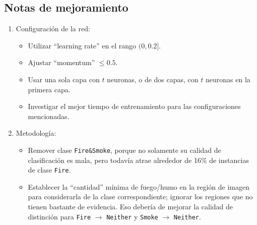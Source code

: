 \documentclass{article}
\begin{document}
\subsection{Notas de mejoramiento}
\begin{enumerate}
\item Configuración de la red:
    \begin{itemize}
        \item Utilizar ``learning rate'' en el rango $(0, 0.2]$.
        \item Ajustar ``momentum'' $\leq 0.5$.
        \item Usar una sola capa con $t$ neuronas, o de dos capas, con
              $t$ neuronas en la primera capa.
        \item Investigar el mejor tiempo de entrenamiento para las configuraciones 
              mencionadas.
    \end{itemize}
\item Metodología:
    \begin{itemize}
        \item Remover clase \verb|Fire&Smoke|, porque no solamente su calidad de clasificación es mala, 
        pero todavía atrae alrededor de 16\% de instancias de clase
              \verb|Fire|.
        \item Establecer la ``cantidad'' mínima de fuego/humo en la región de imagen para 
              considerarla de la clase correspondiente; ignorar los regiones que no tienen
              bastante de evidencia. Eso debería de mejorar la calidad de distinción para 
              \verb|Fire| $\rightarrow$ \verb|Neither| y 
              \verb|Smoke| $\rightarrow$ \verb|Neither|.
    \end{itemize}
\end{enumerate}

			 
\end{document}
